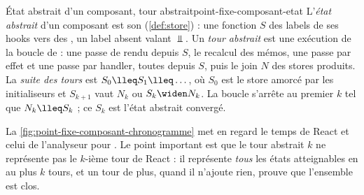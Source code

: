 \begin{definition}{État abstrait d'un composant, tour abstrait}{point-fixe-composant-etat}
L'\emph{état abstrait} d'un composant est son 
(\cref{def:store}) : une fonction $S$ des labels de ses hooks 
vers des , un label absent valant $\Bot$. Un \emph{tour
abstrait} est une exécution de la boucle de  :
une passe de rendu depuis $S$, le recalcul des mémos, une passe par effet
et une passe par handler, toutes depuis $S$, puis le join $N$ des stores
produits. La \emph{suite des tours} est $S_0 \lleq S_1 \lleq \dots$, où $S_0$
est le store amorcé par les initialiseurs et $S_{k+1}$ vaut $N_k$ ou
$S_k \widen N_k$. La boucle s'arrête au premier $k$ tel que
$N_k \lleq S_k$ ; ce $S_k$ est l'état abstrait convergé.
\end{definition}

La \cref{fig:point-fixe-composant-chronogramme} met en regard le temps de
React et celui de l'analyseur pour . Le point important est que
le tour abstrait $k$ ne représente pas le $k$-ième tour de React : il
représente \emph{tous} les états atteignables en au plus $k$ tours, et un
tour de plus, quand il n'ajoute rien, prouve que l'ensemble est clos.

